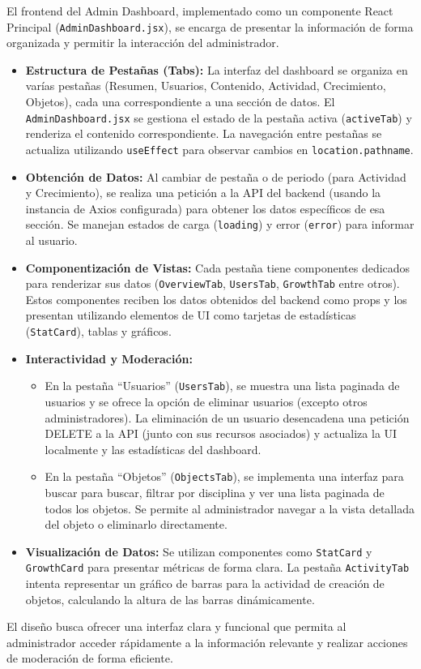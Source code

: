 El frontend del Admin Dashboard, implementado como un componente React Principal (\texttt{AdminDashboard.jsx}), se encarga de presentar la información de forma organizada y permitir la interacción del administrador.
\begin{itemize}
    \item \textbf{Estructura de Pestañas (Tabs):} La interfaz del dashboard se organiza en varías pestañas (Resumen, Usuarios, Contenido, Actividad, Crecimiento, Objetos), cada una correspondiente a una sección de datos. El \texttt{AdminDashboard.jsx} se gestiona el estado de la pestaña activa (\texttt{activeTab}) y renderiza el contenido correspondiente. La navegación entre pestañas se actualiza utilizando \texttt{useEffect} para observar cambios en \texttt{location.pathname}.
    \item \textbf{Obtención de Datos:} Al cambiar de pestaña o de periodo (para Actividad y Crecimiento), se realiza una petición a la API del backend (usando la instancia de Axios configurada) para obtener los datos específicos de esa sección. Se manejan estados de carga (\texttt{loading}) y error (\texttt{error}) para informar al usuario.
    \item \textbf{Componentización de Vistas:} Cada pestaña tiene componentes dedicados para renderizar sus datos (\texttt{OverviewTab}, \texttt{UsersTab}, \texttt{GrowthTab} entre otros). Estos componentes reciben los datos obtenidos del backend como props y los presentan utilizando elementos de UI como tarjetas de estadísticas (\texttt{StatCard}), tablas y gráficos.
    \item \textbf{Interactividad y Moderación:} 
    \begin{itemize}
        \item En la pestaña ``Usuarios'' (\texttt{UsersTab}), se muestra una lista paginada de usuarios y se ofrece la opción de eliminar usuarios (excepto otros administradores). La eliminación de un usuario desencadena una petición DELETE a la API (junto con sus recursos asociados) y actualiza la UI localmente y las estadísticas del dashboard.
        \item En la pestaña ``Objetos'' (\texttt{ObjectsTab}), se implementa una interfaz para buscar para buscar, filtrar por disciplina y ver una lista paginada de todos los objetos. Se permite al administrador navegar a la vista detallada del objeto o eliminarlo directamente.
    \end{itemize}
    \item \textbf{Visualización de Datos:} Se utilizan componentes como \texttt{StatCard} y \texttt{GrowthCard} para presentar métricas de forma clara. La pestaña \texttt{ActivityTab} intenta representar un gráfico de barras para la actividad de creación de objetos, calculando la altura de las barras dinámicamente.
\end{itemize}
El diseño busca ofrecer una interfaz clara y funcional que permita al administrador acceder rápidamente a la información relevante y realizar acciones de moderación de forma eficiente.

